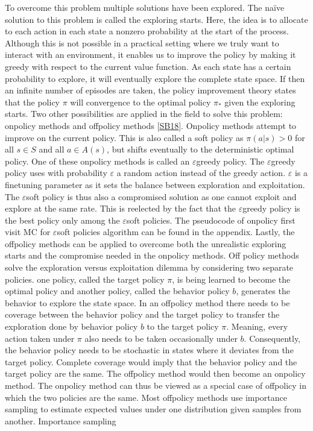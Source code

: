 \documentclass[letterpaper,10pt,english]{jupyterBook}
\begin{document}
\sphinxAtStartPar
To overcome this problem multiple solutions have been explored. The naïve solution to this problem is called the exploring starts. Here, the idea is to allocate to each action in each state a nonzero probability at the start of the process. Although this is not possible in a practical setting where we truly want to interact with an environment, it enables us to improve the policy by making it greedy with respect to the current value function. As each state has a certain probability to explore, it will eventually explore the complete state space. If then an infinite number of episodes are taken, the policy improvement theory states that the policy \(\pi\) will convergence to the optimal policy \(\pi_*\) given the exploring starts. Two other possibilities are applied in the field to solve this problem: on\sphinxhyphen{}policy methods and off\sphinxhyphen{}policy methods {[}\hyperlink{cite.Discussion:id57}{SB18}{]}. On\sphinxhyphen{}policy methods attempt to improve on the current policy. This is also called a soft policy as \(\pi(a|s) > 0\) for all \(s \in S\) and all \( a \in A(s)\), but shifts eventually to the deterministic optimal policy. One of these on\sphinxhyphen{}policy methods is called an \(\varepsilon\)\sphinxhyphen{}greedy policy. The \(\varepsilon\)\sphinxhyphen{}greedy policy uses with probability \(\varepsilon\) a random action instead of the greedy action. \(\varepsilon\) is a fine\sphinxhyphen{}tuning parameter as it sets the balance between exploration and exploitation. The \(\varepsilon\)\sphinxhyphen{}soft policy is thus also a compromised solution as one cannot exploit and explore at the same rate. This is reelected by the fact that the \(\varepsilon\)\sphinxhyphen{}greedy policy is the best policy only among the \(\varepsilon\)\sphinxhyphen{}soft policies. The pseudocode of on\sphinxhyphen{}policy first visit MC for \(\varepsilon\)\sphinxhyphen{}soft policies algorithm can be found in the appendix. Lastly, the off\sphinxhyphen{}policy methods can be applied to overcome both the unrealistic exploring starts and the compromise needed in the on\sphinxhyphen{}policy methods. Off policy methods solve the exploration versus exploitation dilemma by considering two separate policies. one policy, called the target policy \(\pi\), is being learned to become the optimal policy and another policy, called the behavior policy \(b\), generates the behavior to explore the state space. In an off\sphinxhyphen{}policy method there needs to be coverage between the behavior policy and the target policy to transfer the exploration done by behavior policy \(b\) to the target policy \(\pi\). Meaning, every action taken under \(\pi\) also needs to be taken occasionally under \(b\). Consequently, the behavior policy needs to be stochastic in states where it deviates from the target policy. Complete coverage would imply that the behavior policy and the target policy are the same. The off\sphinxhyphen{}policy method would then become an on\sphinxhyphen{}policy method. The on\sphinxhyphen{}policy method can thus be viewed as a special case of off\sphinxhyphen{}policy in which the two policies are the same. Most off\sphinxhyphen{}policy methods use importance sampling to estimate expected values under one distribution given samples from another. Importance sampling 
\end{document}
